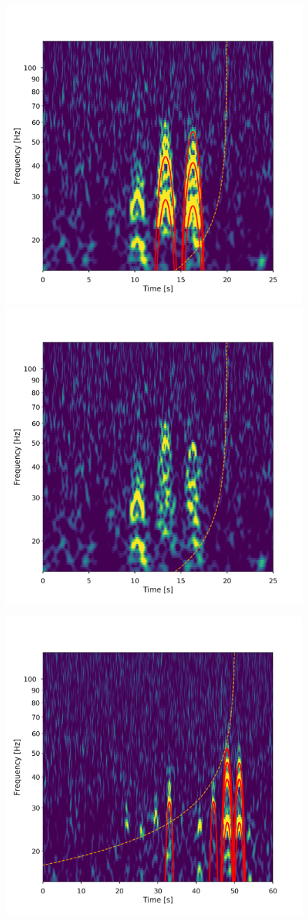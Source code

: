 \begin{figure}
  \centering
  \begin{minipage}[t]{1.0\linewidth}
    \includegraphics[width=0.49\linewidth]{images/archenemy/Section4/4.1/BBH_H1_loud_Original.pdf}
    \hspace{0.02\linewidth}
    \includegraphics[width=0.49\linewidth]{images/archenemy/Section4/4.1/BBH_H1_loud_Subtracted.pdf}
  \end{minipage}
  \begin{minipage}[t]{1.0\linewidth}
    \includegraphics[width=0.49\linewidth]{images/archenemy/Section4/4.1/NSBH_H1_loud_Original.pdf}
    \hspace{0.02\linewidth}

\end{minipage}
\end{figure}
